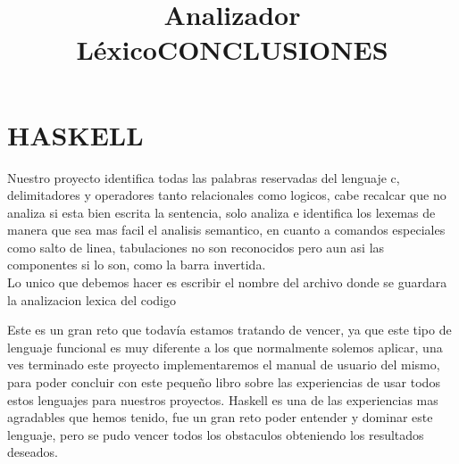 \documentclass[12pt]{extbook}
\begin{document}
\chapter{HASKELL}
\begin{center}
\title{\Large{Analizador Léxico}}\maketitle
\end{center}
Nuestro proyecto identifica todas las palabras reservadas del lenguaje c, delimitadores y operadores tanto relacionales como logicos, cabe recalcar que no analiza si esta bien escrita la sentencia, solo analiza e identifica los lexemas de manera que sea mas facil el analisis semantico, en cuanto a comandos especiales como salto de linea, tabulaciones no son reconocidos pero aun asi las componentes si lo son, como la barra invertida.\\
Lo unico que debemos hacer es escribir el nombre del archivo donde se
guardara la analizacion lexica del codigo\\



\begin{center}
\title{CONCLUSIONES}\maketitle
\end{center}

Este es un gran reto que todavía estamos tratando de vencer, ya que
este tipo de lenguaje funcional es muy diferente a los que normalmente
solemos aplicar, una ves terminado este proyecto implementaremos el
manual de usuario del mismo, para poder concluir con este pequeño
libro sobre las experiencias de usar todos estos lenguajes para nuestros
proyectos.
Haskell es una de las experiencias mas agradables que hemos tenido, fue un
gran reto poder entender y dominar este lenguaje, pero se pudo vencer todos
los obstaculos obteniendo los resultados deseados.
\end{document}
